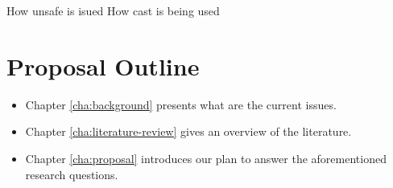 How unsafe is isued
How cast is being used

\section{Proposal Outline}

\begin{itemize}
\item Chapter \ref{cha:background} presents what are the current issues.
\item Chapter \ref{cha:literature-review} gives an overview of the literature.
\item Chapter \ref{cha:proposal} introduces our plan to answer the aforementioned research questions.
\end{itemize}
